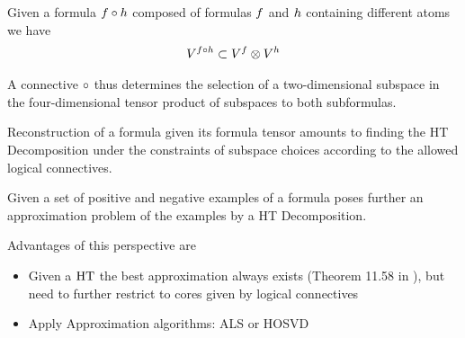 Given a formula $f\circ h$ composed of formulas $f$ and $h$ containing different atoms we have
\begin{align}
	V^{f\circ h} 
	\subset V^{f} \otimes V^{h}
\end{align}

A connective $\circ$ thus determines the selection of a two-dimensional subspace in the four-dimensional tensor product of subspaces to both subformulas.


Reconstruction of a formula given its formula tensor amounts to finding the HT Decomposition under the constraints of subspace choices according to the allowed logical connectives.

Given a set of positive and negative examples of a formula poses further an approximation problem of the examples by a HT Decomposition.

Advantages of this perspective are
\begin{itemize}
	\item Given a $\mathrm{HT}$ the best approximation always exists (Theorem 11.58 in \cite{hackbusch_tensor_2012}), but need to further restrict to cores given by logical connectives 
	\item Apply Approximation algorithms: ALS or HOSVD
\end{itemize}




%
%













